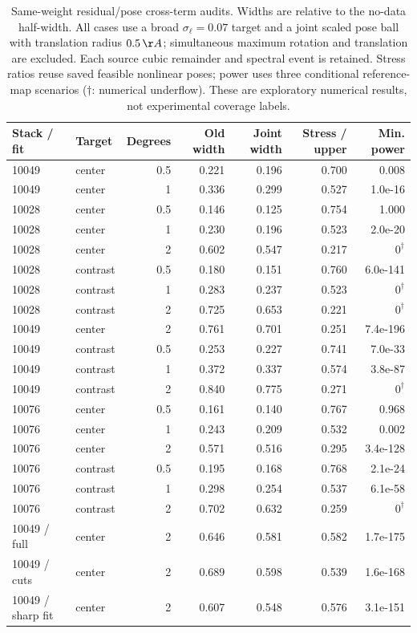 \begin{table}[t]
\centering
\begin{tabular}{llrrrrr}
\toprule
Stack / fit & Target & Degrees & Old width & Joint width & Stress / upper & Min. power \\
\midrule
10049 & center & 0.5 & 0.221 & 0.196 & 0.700 & 0.008 \\
10049 & center & 1 & 0.336 & 0.299 & 0.527 & 1.0e-16 \\
10028 & center & 0.5 & 0.146 & 0.125 & 0.754 & 1.000 \\
10028 & center & 1 & 0.230 & 0.196 & 0.523 & 2.0e-20 \\
10028 & center & 2 & 0.602 & 0.547 & 0.217 & $0^\dagger$ \\
10028 & contrast & 0.5 & 0.180 & 0.151 & 0.760 & 6.0e-141 \\
10028 & contrast & 1 & 0.283 & 0.237 & 0.523 & $0^\dagger$ \\
10028 & contrast & 2 & 0.725 & 0.653 & 0.221 & $0^\dagger$ \\
10049 & center & 2 & 0.761 & 0.701 & 0.251 & 7.4e-196 \\
10049 & contrast & 0.5 & 0.253 & 0.227 & 0.741 & 7.0e-33 \\
10049 & contrast & 1 & 0.372 & 0.337 & 0.574 & 3.8e-87 \\
10049 & contrast & 2 & 0.840 & 0.775 & 0.271 & $0^\dagger$ \\
10076 & center & 0.5 & 0.161 & 0.140 & 0.767 & 0.968 \\
10076 & center & 1 & 0.243 & 0.209 & 0.532 & 0.002 \\
10076 & center & 2 & 0.571 & 0.516 & 0.295 & 3.4e-128 \\
10076 & contrast & 0.5 & 0.195 & 0.168 & 0.768 & 2.1e-24 \\
10076 & contrast & 1 & 0.298 & 0.254 & 0.537 & 6.1e-58 \\
10076 & contrast & 2 & 0.702 & 0.632 & 0.259 & $0^\dagger$ \\
10049 / full & center & 2 & 0.646 & 0.581 & 0.582 & 1.7e-175 \\
10049 / cuts & center & 2 & 0.689 & 0.598 & 0.539 & 1.6e-168 \\
10049 / sharp fit & center & 2 & 0.607 & 0.548 & 0.576 & 3.1e-151 \\
\bottomrule
\end{tabular}
\caption{Same-weight residual/pose cross-term audits. Widths are relative to the no-data half-width. All cases use a broad $\sigma_\ell=0.07$ target and a joint scaled pose ball with translation radius $0.5\,\AA$; simultaneous maximum rotation and translation are excluded. Each source cubic remainder and spectral event is retained. Stress ratios reuse saved feasible nonlinear poses; power uses three conditional reference-map scenarios ($\dagger$: numerical underflow). These are exploratory numerical results, not experimental coverage labels.}
\label{tab:joint-bias}
\end{table}

